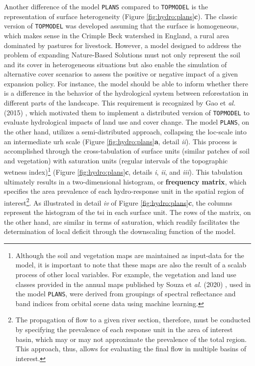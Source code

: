\documentclass[./main_en.tex]{subfiles}
\begin{document}
\par Another difference of the \gls{model} \texttt{PLANS} compared to \texttt{TOPMODEL} is the representation of surface heterogeneity (Figure \ref{fig:hydro:plans}\textbf{c}). The classic version of \texttt{TOPMODEL} was developed assuming that the surface is homogeneous, which makes sense in the Crimple Beck watershed in England, a rural area dominated by pastures for livestock. However, a \gls{model} designed to address the problem of expanding Nature-Based Solutions must not only represent the soil and its cover in heterogeneous situations but also enable the simulation of alternative cover scenarios to assess the positive or negative impact of a given expansion policy. For instance, the \gls{model} should be able to inform whether there is a difference in the behavior of the hydrological \gls{system} between reforestation in different parts of the landscape. This requirement is recognized by Gao et \textit{al.} (2015) \cite{Gao2015a}, which motivated them to implement a distributed version of \texttt{TOPMODEL} to evaluate hydrological impacts of land use and cover change. The \gls{model} \texttt{PLANS}, on the other hand, utilizes a semi-distributed approach, collapsing the \gls{loc-scale} into an intermediate \gls{urh} scale (Figure \ref{fig:hydro:plans}\textbf{a}, detail \textit{ii}). This process is accomplished through the cross-tabulation of surface units (similar patches of soil and vegetation) with saturation units (regular intervals of the topographic wetness index)\footnote{Although the soil and vegetation maps are maintained as \gls{input-data} for the \gls{model}, it is important to note that these maps are also the result of a \gls{scalab} process of other local variables. For example, the vegetation and land use classes provided in the annual maps published by Souza et \textit{al.} (2020) \cite{Souza2020a}, used in the \gls{model} \texttt{PLANS}, were derived from groupings of spectral reflectance and band indices from orbital scene data using machine learning.} (Figure \ref{fig:hydro:plans}\textbf{c}, details \textit{i}, \textit{ii}, and \textit{iii}). This tabulation ultimately results in a two-dimensional histogram, or \textbf{frequency matrix}, which specifies the area prevalence of each \gls{hydro-response} unit in the spatial region of interest\footnote{The propagation of flow to a given river section, therefore, must be conducted by specifying the prevalence of each response unit in the area of interest basin, which may or may not approximate the prevalence of the total region. This approach, thus, allows for evaluating the final flow in multiple basins of interest.}. As illustrated in detail \textit{iv} of Figure \ref{fig:hydro:plans}\textbf{c}, the columns represent the histogram of the \gls{tsi} in each surface unit. The rows of the matrix, on the other hand, are similar in terms of saturation, which readily facilitates the determination of local deficit through the \gls{downscaling} function of the \gls{model}.
\end{document}
